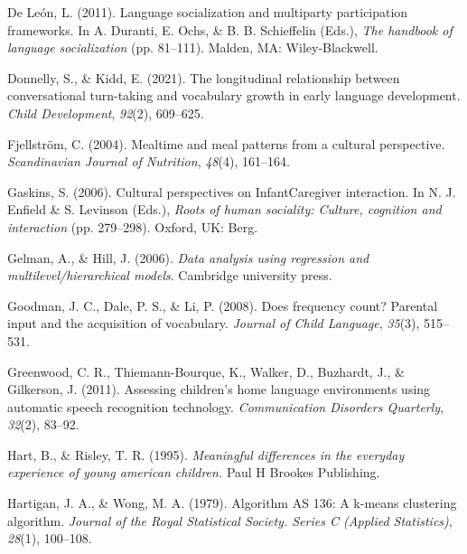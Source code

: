 \documentclass[
  man,floatsintext]{apa6}
\newlength{\cslhangindent}
\newlength{\cslentryspacingunit} %
\newenvironment{CSLReferences}[2] %
 {%
  \setlength{\parindent}{0pt}
  \ifodd #1
  \let\oldpar\par
  \def\par{\hangindent=\cslhangindent\oldpar}
  \fi
  \setlength{\parskip}{#2\cslentryspacingunit}
 }%
 {}
\begin{document}
\begin{CSLReferences}{1}{0}
\leavevmode{}%
De León, L. (2011). Language socialization and multiparty participation frameworks. In A. Duranti, E. Ochs, \& B. B. Schieffelin (Eds.), \emph{The handbook of language socialization} (pp. 81--111). Malden, MA: Wiley-Blackwell.

\leavevmode{}%
Donnelly, S., \& Kidd, E. (2021). The longitudinal relationship between conversational turn-taking and vocabulary growth in early language development. \emph{Child Development}, \emph{92}(2), 609--625.

\leavevmode{}%
Fjellström, C. (2004). Mealtime and meal patterns from a cultural perspective. \emph{Scandinavian Journal of Nutrition}, \emph{48}(4), 161--164.

\leavevmode{}%
Gaskins, S. (2006). Cultural perspectives on InfantCaregiver interaction. In N. J. Enfield \& S. Levinson (Eds.), \emph{Roots of human sociality: Culture, cognition and interaction} (pp. 279--298). Oxford, UK: Berg.

\leavevmode{}%
Gelman, A., \& Hill, J. (2006). \emph{Data analysis using regression and multilevel/hierarchical models}. Cambridge university press.

\leavevmode{}%
Goodman, J. C., Dale, P. S., \& Li, P. (2008). Does frequency count? Parental input and the acquisition of vocabulary. \emph{Journal of Child Language}, \emph{35}(3), 515--531.

\leavevmode{}%
Greenwood, C. R., Thiemann-Bourque, K., Walker, D., Buzhardt, J., \& Gilkerson, J. (2011). Assessing children's home language environments using automatic speech recognition technology. \emph{Communication Disorders Quarterly}, \emph{32}(2), 83--92.

\leavevmode{}%
Hart, B., \& Risley, T. R. (1995). \emph{Meaningful differences in the everyday experience of young american children.} Paul H Brookes Publishing.

\leavevmode{}%
Hartigan, J. A., \& Wong, M. A. (1979). Algorithm AS 136: A k-means clustering algorithm. \emph{Journal of the Royal Statistical Society. Series C (Applied Statistics)}, \emph{28}(1), 100--108.


\end{CSLReferences}
\end{document}
